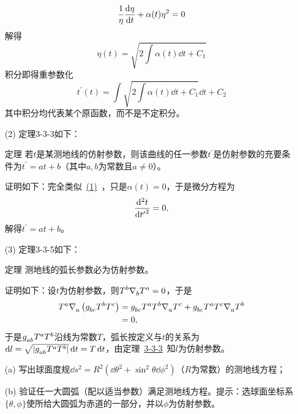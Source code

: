 \begin{xiti}
\begin{zm}
\begin{enumerate}
		    \begin{displaymath}
		    \frac{1}{\eta} \dv{\eta}{t}+\alpha(t) \eta^2=0
		    \end{displaymath}
		    解得\[\eta(t)= \sqrt{2 \int \alpha(t) \dd{t}+C_1 }\]积分即得重参数化\[t^\prime(t)= \int\sqrt{2\int\alpha(t)\dd{t}+C_1}\dd{t}+C_2 \]其中积分均代表某个原函数，而不是不定积分。
		    \item[(2)] 定理3-3-3如下：
		    \begin{yl}{{\heiti 定理}}
		    	\hypertarget{th3-3-3}{}若$t$是某测地线的仿射参数，则该曲线的任一参数$t^\prime $是仿射参数的充要条件为$t^\prime =a t+b $（其中$a,b$为常数且$a\neq 0 $）。
		    \end{yl}
	        证明如下：完全类似~\hyperlink{3.9.1}{(1)}~，只是$\alpha(t)=0 $，于是微分方程为
	        $$ \dv[2]{t}{{t^\prime}}=0, $$解得$t^\prime=a t+b $。
	        \item[(3)] 定理3-3-5如下：
	        \begin{yl}{{\heiti 定理}}
	        	测地线的弧长参数必为仿射参数。
	        \end{yl}
            证明如下：设$t$为仿射参数，则$\displaystyle \tensor{T}{^b} \Nabla{b} \tensor{T}{^a} =0 $，于是
            \begin{align*}
            \tensor{T}{^a} \Nabla{a} \left( \tensor{g}{_b_c} \tensor{T}{^b} \tensor{T}{^c} \right) &=\tensor{g}{_b_c} \tensor{T}{^a} \tensor{T}{^b} \Nabla{a} \tensor{T}{^c} + \tensor{g}{_b_c} \tensor{T}{^a} \tensor{T}{^c} \Nabla{a} \tensor{T}{^b} \\
            &=0,
            \end{align*}
            于是$\tensor{g}{_a_b} \tensor{T}{^a} \tensor{T}{^b} $沿线为常数$T$，弧长按定义与$t$的关系为$ \dd{l} = \sqrt{ \abs{ \tensor{g}{_a_b} \tensor{T}{^a} \tensor{T}{^b} }} \dd{t}=T\dd{t} $，由定理~\hyperlink{th3-3-3}{3-3-3}~知$l$为仿射参数。
		\end{enumerate}
	\end{zm}

	\item \begin{enumerate}
		\item[(a)] \hypertarget{2.10}{}写出球面度规$\dd{s}^2=R^2 \left( \dd{\theta}^2 +\sin^2 \theta \dd{\phi}^2 \right) $（$R$为常数）的测地线方程；
		\item[(b)] 验证任一大圆弧（配以适当参数）满足测地线方程。提示：选球面坐标系$\{\theta,\phi \} $使所给大圆弧为赤道的一部分，并以$\phi$为仿射参数。
	\end{enumerate}


\end{xiti}
